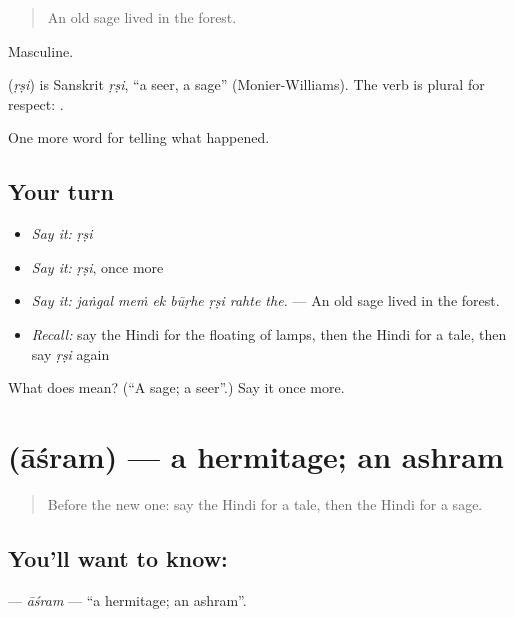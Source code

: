 \begin{quote}
An old sage lived in the forest.
\end{quote}

Masculine.

\begin{cousinweb}
\textbf{} (\emph{ṛṣi}) is Sanskrit \emph{ṛṣi}, \textquotedblleft{}a seer, a sage\textquotedblright{} (Monier-Williams). The verb is plural for respect: \textbf{  }.
\end{cousinweb}

\begin{grammarlens}[title={What you've built}]
One more word for telling what happened.
\end{grammarlens}

\subsection*{Your turn}
\begin{itemize}
\raggedright
  \item \emph{Say it:} \emph{ṛṣi}
  \item \emph{Say it:} \emph{ṛṣi}, once more
  \item \emph{Say it:} \emph{jaṅgal meṁ ek būṛhe ṛṣi rahte the.} — An old sage lived in the forest.
  \item \emph{Recall:} say the Hindi for the floating of lamps, then the Hindi for a tale, then say \emph{ṛṣi} again
\end{itemize}

\begin{tcolorbox}[breakable,colback=teal!4,colframe=teal!35!black,title={Before you move on}]
What does  mean? (\textquotedblleft{}A sage; a seer\textquotedblright{}.) Say it once more.
\end{tcolorbox}
\section[\texorpdfstring{\hi{आश्रम} (āśram)}{आश्रम (āśram)}]{ (āśram) — a hermitage; an ashram}

\label{lesson:HI-C334-asram}



\begin{quote}
Before the new one: say the Hindi for a tale, then the Hindi for a sage.
\end{quote}

\subsection*{You'll want to know: }
\textbf{} — \emph{āśram} — \textquotedblleft{}a hermitage; an ashram\textquotedblright{}.

